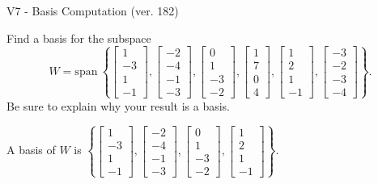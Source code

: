 \begin{exercise}
  \begin{exerciseTitle}V7 - Basis Computation (ver. 182)\end{exerciseTitle}
  \begin{exerciseStatement}
    Find a basis for the subspace 
\[W=\mathrm{span}\ \left\{\left[\begin{array}{r}
1 \\
-3 \\
1 \\
-1
\end{array}\right] , \left[\begin{array}{r}
-2 \\
-4 \\
-1 \\
-3
\end{array}\right] , \left[\begin{array}{r}
0 \\
1 \\
-3 \\
-2
\end{array}\right] , \left[\begin{array}{r}
1 \\
7 \\
0 \\
4
\end{array}\right] , \left[\begin{array}{r}
1 \\
2 \\
1 \\
-1
\end{array}\right] , \left[\begin{array}{r}
-3 \\
-2 \\
-3 \\
-4
\end{array}\right]\right\}.\]
 Be sure to explain why your result is a basis.


  \end{exerciseStatement}
  \begin{exerciseAnswer}
   A basis of \(W\) is  \(\left\{\left[\begin{array}{r}
1 \\
-3 \\
1 \\
-1
\end{array}\right] , \left[\begin{array}{r}
-2 \\
-4 \\
-1 \\
-3
\end{array}\right] , \left[\begin{array}{r}
0 \\
1 \\
-3 \\
-2
\end{array}\right] , \left[\begin{array}{r}
1 \\
2 \\
1 \\
-1
\end{array}\right]\right\}\).
  


  \end{exerciseAnswer}
\end{exercise}